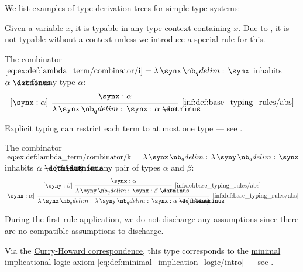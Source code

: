 \begin{example}\label{ex:def:type_derivation_tree}
  We list examples of \hyperref[def:type_derivation_tree]{type derivation trees} for \hyperref[def:simple_type_system]{simple type systems}:
  \begin{thmenum}
     Given a variable \( x \), it is typable in any \hyperref[def:type_context]{type context} containing \( x \). Due to , it is not typable without a context unless we introduce a special rule for this.

     The combinator \( \ref{eq:ex:def:lambda_term/combinator/i} = \qabs \synx \synx \) inhabits \( \alpha \synimplies \alpha \) for any type \( \alpha \):
    \begin{equation*}
      \begin{prooftree}
        \hypo{ \synx: \alpha }
        \infer[left label=\( [\synx: \alpha] \)]1[\ref{inf:def:base_typing_rules/abs}]{ \qabs \synx \synx: \alpha \synimplies \alpha }
      \end{prooftree}
    \end{equation*}

    \hyperref[rem:explicit_and_implicit_typing]{Explicit typing} can restrict each term to at most one type --- see .

     The combinator \( \ref{eq:ex:def:lambda_term/combinator/k} = \qabs \synx \qabs \syny \synx \) inhabits \( \alpha \synimplies (\beta \synimplies \alpha) \) for any pair of types \( \alpha \) and \( \beta \):
    \begin{equation*}
      \begin{prooftree}
        \hypo{ \synx: \alpha }
        \infer[left label=\( [\syny: \beta] \)]1[\ref{inf:def:base_typing_rules/abs}]{ \qabs \syny \synx: \beta \synimplies \alpha }
        \infer[left label=\( [\synx: \alpha] \)]1[\ref{inf:def:base_typing_rules/abs}]{ \qabs \synx \qabs \syny \synx: \alpha \synimplies (\beta \synimplies \alpha) }
      \end{prooftree}
    \end{equation*}

    During the first rule application, we do not discharge any assumptions since there are no compatible assumptions to discharge.

    Via the \hyperref[con:curry_howard_correspondence]{Curry-Howard correspondence}, this type corresponds to the \hyperref[def:minimal_implication_logic]{minimal implicational logic} axiom \eqref{eq:def:minimal_implication_logic/intro} --- see .


\end{thmenum}
\end{example}
